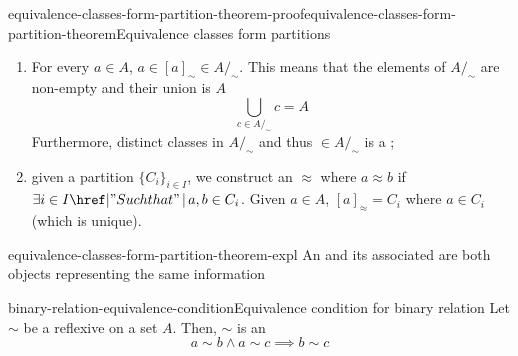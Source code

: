 \documentclass[preview]{standalone}
\begin{document}
\begin{snippetproof}{equivalence-classes-form-partition-theorem-proof}{equivalence-classes-form-partition-theorem}{Equivalence classes form partitions}
    \begin{enumerate}
        \item For every \(a\in A\), \(a \in {[a]}_\sim \in A/_\sim\). This means that the elements of \(A/_\sim\)
            are non-empty and their union is \(A\)
            \[ \bigcup_{c \in A/_\sim} c = A\]
            Furthermore, distinct classes in \(A/_\sim\)  and 
            thus \(\in A/_\sim\) is a \partition;
        \item given a partition \(\{C_i\}_{i\in I}\), we construct an \equivrelation \(\approx\) where
        \(a \approx b\) if \(\exists i\in I \suchthat a,b \in C_i \).
        Given \(a\in A\), \({[a]}_\approx = C_i\) where \(a \in C_i\) (which is unique).
    \end{enumerate}
\end{snippetproof}

\begin{snippet}{equivalence-classes-form-partition-theorem-expl}
    An \equivrelation and its associated \partition are both objects representing the same information
\end{snippet}

\begin{snippetproposition}{binary-relation-equivalence-condition}{Equivalence condition for binary relation}
    Let \(\sim\) be a reflexive \binrelation on a set \(A\).
    Then, \(\sim\) is an \equivrelation \ifandonlyif
    \[ a\sim b \land a \sim c \implies b \sim c \]
\end{snippetproposition}
\end{document}
